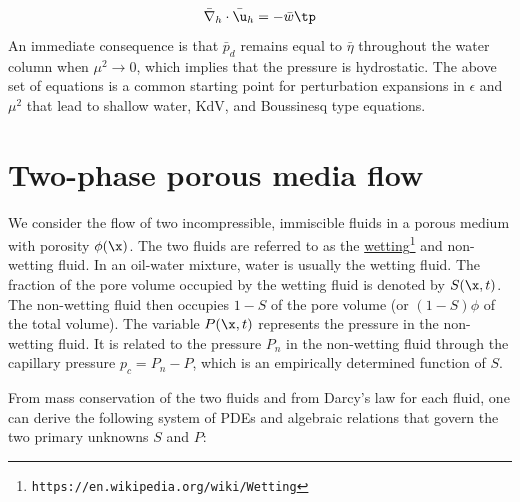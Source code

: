 \documentclass[graybox,envcountchap,sectrefs,final]{svmonodo}
\begin{document}
\begin{equation}
\label{scale:surfacewave:kinbott3}
\bar\nabla_h\cdot\bar\u_h =-\bar w\tp
\end{equation}
An immediate consequence is that $\bar p_d$ remains equal to $\bar \eta$ throughout the water column when $\mu^2\rightarrow 0$, which implies that the pressure
is hydrostatic. The above set of equations is a common  starting point for
perturbation expansions in $\epsilon$ and $\mu^2$ that lead to shallow water,
KdV, and Boussinesq type equations.


\section{Two-phase porous media flow}

We consider the flow of two incompressible, immiscible fluids in
a porous medium with porosity $\phi (\x)$. The two fluids are referred to
as the \href{{https://en.wikipedia.org/wiki/Wetting}}{wetting}\footnote{\texttt{https://en.wikipedia.org/wiki/Wetting}} and
non-wetting fluid. In an oil-water mixture, water is usually the
wetting fluid. The fraction of the pore volume occupied by the
wetting fluid is denoted by $S(\x,t)$. The non-wetting fluid then occupies
$1-S$ of the pore volume (or $(1-S)\phi$ of the total volume).
The variable $P(\x,t)$ represents the pressure in the non-wetting fluid.
It is related to the pressure $P_n$ in the non-wetting fluid through
the capillary pressure $p_c=P_n-P$, which is an empirically determined
function of $S$.

From mass conservation of the two fluids and from Darcy's law for
each fluid, one can derive the following system of PDEs and
algebraic relations that govern the two primary unknowns $S$ and $P$:
\end{document}
